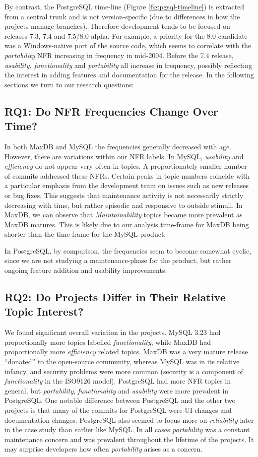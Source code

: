 \documentclass[smallextended]{svjour3}       %
\begin{document}
By contrast, the PostgreSQL time-line  (Figure \ref{fig:pgsql-timeline}) is extracted from a central trunk and is not version-specific (due to differences in how the projects manage branches). Therefore development 
tends to be focused on releases 7.3, 7.4 and 7.5/8.0 alpha. For example, a priority for the 8.0 candidate was a Windows-native port of the source code, which seems to 
correlate with the \emph{portability} NFR increasing in frequency in mid-2004. Before the 7.4 release, \emph{usability, functionality} and \emph{portability} all 
increase in frequency, possibly reflecting the interest in adding features and documentation for the release. In the following sections we turn to our research questions:


\subsection{RQ1: Do NFR Frequencies Change Over Time?}
In both MaxDB and MySQL the frequencies generally decreased with age. 
However, there are variations within our NFR labels. In MySQL, \emph{usability} and \emph{efficiency} do not appear very often in topics. 
A proportionately smaller number of commits addressed these NFRs.
Certain peaks in topic numbers coincide with a particular emphasis from the development team on issues such as new releases or bug fixes.
This suggests that maintenance activity is not necessarily strictly decreasing with time, but rather episodic and responsive to outside stimuli. 
In MaxDB, we can observe that \emph{Maintainability} topics became more prevalent as MaxDB matures. 
This is likely due to our analysis time-frame for MaxDB being shorter than the time-frame for the MySQL product. 

In PostgreSQL, by comparison, the frequencies seem to become somewhat cyclic, since we are not studying a maintenance-phase for the product, but rather ongoing
feature addition and usability improvements.

\subsection{RQ2: Do Projects Differ in Their Relative  Topic Interest?}
We found significant overall variation in the projects. MySQL 3.23 had proportionally more
topics labelled \emph{functionality}, while MaxDB had proportionally more
\emph{efficiency} related topics. MaxDB was a very mature release ``donated'' to the open-source community, 
whereas MySQL was in its relative infancy, and	
security problems were more common (security is a component of \emph{functionality} in the ISO9126 model). 
PostgreSQL had more NFR topics in general, but \emph{portability},
\emph{functionality} and \emph{usability} were more prevalent in
PostgreSQL. One notable difference between PostgreSQL and the other
two projects is that many of the commits for PostgreSQL were UI
changes and documentation changes. PostgreSQL also seemed to focus
more on \emph{reliability} later in the case study than earlier like MySQL.
In all cases \emph{portability} was a constant maintenance concern and was prevalent throughout the lifetime of the projects. It may surprise developers
how often \emph{portability} arises as a concern.
\end{document}
